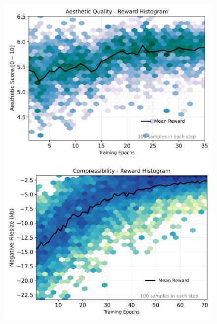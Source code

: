 
\begin{figure}[ht]
  \centering
  \begin{minipage}{0.5\textwidth}
      \centering
      \includegraphics[width=1\textwidth]{img/results/reward_hist-laion-aesthetic.png} %
  \end{minipage}\hfill
  \begin{minipage}{0.5\textwidth}
      \centering
  \end{minipage}\vspace{-0.1cm} %
  \begin{minipage}{0.5\textwidth}
      \centering
      \includegraphics[width=1\textwidth]{img/results/reward_hist-jpeg-compressibility.png} %

\end{minipage}
\end{figure}
